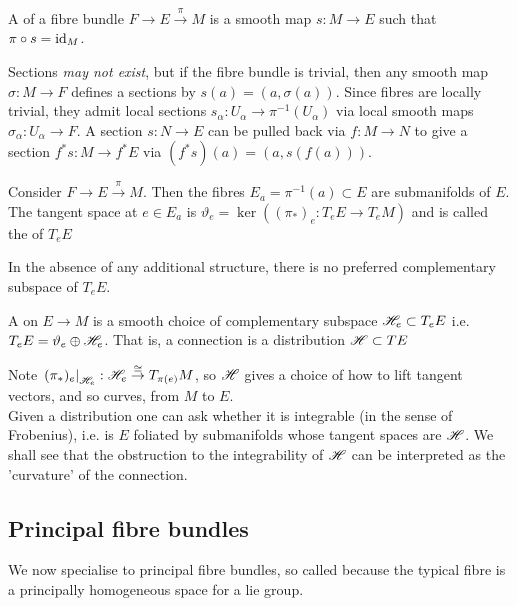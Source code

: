 \documentclass{article}
\begin{document}
\begin{definition}
	A  of a fibre bundle $F \to E \overset{\pi}{\to} M$ is a smooth map $s:M \to E$ such that $\pi\circ s = \operatorname{id}_M$. 
\end{definition}

Sections \emph{may not exist}, but if the fibre bundle is trivial, then any smooth map $\sigma : M \to F$ defines a sections by $s(a) = (a,\sigma(a))$. Since fibres are locally trivial, they admit local sections $s_\alpha : U_\alpha \to \pi^{-1}(U_\alpha)$ via local smooth maps $\sigma_\alpha : U_\alpha \to F$. A section $s:N \to E$ can be pulled back via $f:M \to N$ to give a section $f^\ast s : M \to f^\ast E$ via $(f^\ast s)(a) = (a,s(f(a)))$. 

\begin{definition}
	Consider $F \to E \overset{\pi}{\to} M$. Then the fibres $E_a = \pi^{-1}(a) \subset E$ are submanifolds of $E$. The tangent space at $e \in E_a$ is $\vartheta_e = \ker((\pi_\ast)_e : T_e E \to T_e M)$ and is called the  of $T_eE$
\end{definition}
In the absence of any additional structure, there is no preferred complementary subspace of $T_eE$.

\begin{definition}
	A  on $E \to M$ is a smooth choice of complementary subspace $\mathscr{H}_e \subset T_e E$ i.e. $T_eE = \vartheta_e \oplus \mathscr{H}_e$. That is, a connection is a distribution $\mathscr{H}\subset TE$
\end{definition}

Note $\left. (\pi_\ast)_e \right\rvert_{\mathscr{H}_e} : \mathscr{H}_e \overset{\cong}{\to} T_{\pi(e)}M$, so $\mathscr{H}$ gives a choice of how to lift tangent vectors, and so curves, from $M$ to $E$. \\
Given a distribution one can ask whether it is integrable (in the sense of Frobenius), i.e. is $E$ foliated by submanifolds whose tangent spaces are $\mathscr{H}$. We shall see that the obstruction to the integrability of $\mathscr{H}$ can be interpreted as the 'curvature' of the connection. 
\subsection{Principal fibre bundles}
We now specialise to principal fibre bundles, so called because the typical fibre is a principally homogeneous space for a lie group. 
\end{document}
